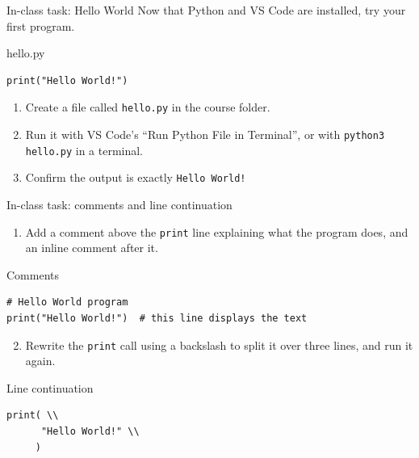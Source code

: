 \documentclass[aspectratio=169,11pt]{beamer}
\begin{document}
\begin{frame}[fragile]{In-class task: Hello World}
  Now that Python and VS Code are installed, try your first program.
  \begin{block}{hello.py}
\begin{verbatim}
print("Hello World!")
\end{verbatim}
  \end{block}
  \begin{enumerate}
    \item Create a file called \texttt{hello.py} in the course folder.
    \item Run it with VS Code's ``Run Python File in Terminal'', or with
          \texttt{python3 hello.py} in a terminal.
    \item Confirm the output is exactly \texttt{Hello World!}
  \end{enumerate}
\end{frame}

\begin{frame}[fragile]{In-class task: comments and line continuation}
  \begin{enumerate}
    \item Add a comment above the \texttt{print} line explaining what the
          program does, and an inline comment after it.
  \end{enumerate}
  \begin{block}{Comments}
\begin{verbatim}
# Hello World program
print("Hello World!")  # this line displays the text
\end{verbatim}
  \end{block}
  \begin{enumerate}
    \setcounter{enumi}{1}
    \item Rewrite the \texttt{print} call using a backslash to split it over
          three lines, and run it again.
  \end{enumerate}
  \begin{block}{Line continuation}
\begin{verbatim}
print( \\
      "Hello World!" \\
     )
\end{verbatim}
  \end{block}
\end{frame}

\end{document}

